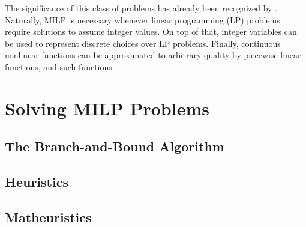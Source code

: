 The significance of this class of problems has already been recognized by .
Naturally, MILP is necessary whenever linear programming (LP) problems require solutions to assume integer values.
On top of that, integer variables can be used to represent discrete choices over LP problems.
Finally, continuous nonlinear functions can be approximated to arbitrary quality by piecewise linear functions, and such functions 


\section{Solving MILP Problems}

\subsection{The Branch-and-Bound Algorithm}

\subsection{Heuristics}

\subsection{Matheuristics}

